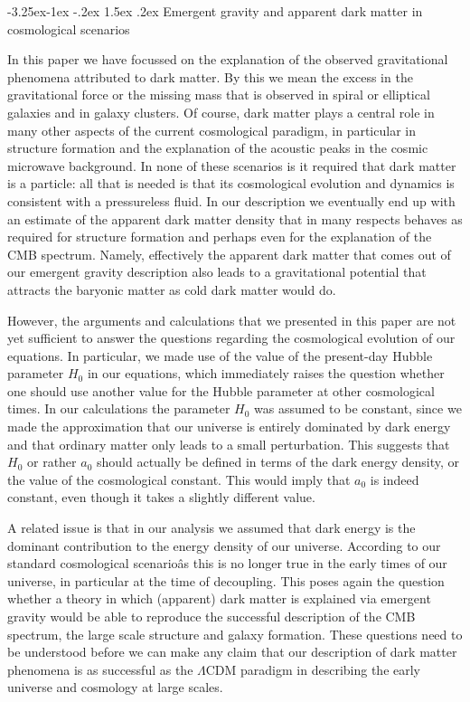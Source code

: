 \documentclass[a4paper,12pt]{article}
\makeatletter
\renewcommand\subsection{\@startsection{subsection}{2}{\z@}%
                                     {-3.25ex\@plus -1ex \@minus -.2ex}%
                                     {1.5ex \@plus .2ex}%
                                     {\normalfont\bfseries}}
\makeatother
\begin{document}
\subsection{Emergent gravity and apparent dark matter in cosmological scenarios}


In this paper we have focussed on the explanation of the observed gravitational phenomena attributed to dark matter. By this we mean the excess in the gravitational force or the missing mass that is observed in spiral or elliptical galaxies and in galaxy clusters. Of course, dark matter plays a central role in many other aspects of the current cosmological paradigm, in particular in structure formation and the explanation of the acoustic peaks in the cosmic microwave background. In none of these scenarios is it required that dark matter is   a particle: all that is needed is that its cosmological evolution and dynamics is consistent with a pressureless fluid. In our description we eventually end up with an estimate of the apparent dark matter density that in many respects behaves as required for structure formation and perhaps even for the explanation of the CMB spectrum. Namely, effectively the apparent dark matter that comes out of our emergent gravity description also leads to a gravitational  potential that attracts the baryonic matter as cold dark matter would do. 

However, the arguments and calculations that we presented in this paper are not yet sufficient  to answer the questions regarding the cosmological evolution of our equations. In particular, we   made use of the value of the present-day Hubble parameter $H_0$ in our equations, which  immediately raises the question whether one should use another value for the Hubble parameter at other cosmological times. In our calculations the parameter $H_0$ was assumed to be constant, since we made the approximation that our universe is entirely dominated by dark energy and that ordinary matter only leads to a small perturbation. This suggests that $H_0$ or rather $a_0$ should actually be defined in terms of the dark energy density, or the value of the cosmological constant.  This would imply that $a_0$ is indeed  constant, even though it takes a slightly different value. 

A related issue is that in our analysis we assumed that dark energy is the dominant contribution to the energy density of our universe. According to our standard cosmological scenarioâs this is no longer true in the early times of our universe, in particular at the time of decoupling.  This poses again the question whether a theory in which   (apparent) dark matter is explained via emergent gravity would be able to reproduce the successful description of the CMB spectrum, the large scale structure and galaxy formation. These questions need to be understood before we can make any claim that our description of dark matter phenomena is as successful as the $\Lambda$CDM paradigm in describing the early universe and cosmology at large scales.  
\end{document}
